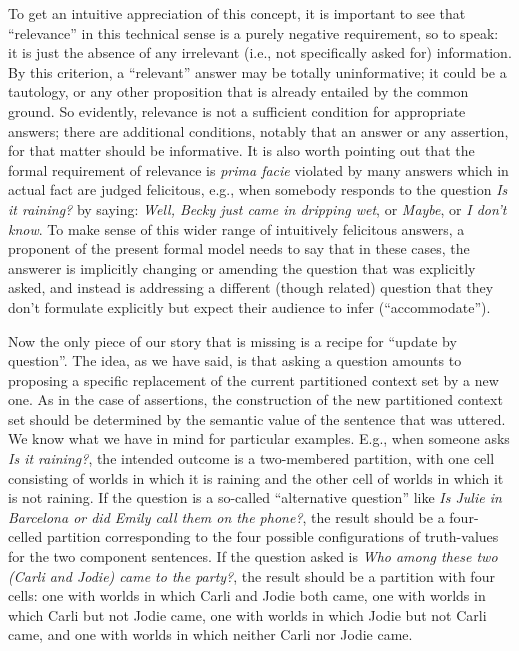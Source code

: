 To get an intuitive appreciation of this concept, it is important to see that
``relevance'' in this technical sense is a purely negative requirement, so to
speak: it is just the absence of any irrelevant (i.e., not specifically asked
for) information. By this criterion, a ``relevant'' answer may be totally
uninformative; it could be a tautology, or any other proposition that is already
entailed by the common ground. So evidently, relevance is not a sufficient
condition for appropriate answers; there are additional conditions, notably that
an answer \dash or any assertion, for that matter \dash should be informative.
It is also worth pointing out that the formal requirement of relevance is
\emph{prima facie} violated by many answers which in actual fact are judged
felicitous, e.g., when somebody responds to the question \emph{Is it raining?}
by saying: \emph{Well, Becky just came in dripping wet}, or \emph{Maybe}, or
\emph{I don't know}. To make sense of this wider range of intuitively felicitous
answers, a proponent of the present formal model needs to say that in these
cases, the answerer is implicitly changing or amending the question that was
explicitly asked, and instead is addressing a different (though related)
question that they don't formulate explicitly but expect their audience to infer
(``accommodate'').

Now the only piece of our story that is missing is a recipe for ``update by
question''. The idea, as we have said, is that asking a question amounts to
proposing a specific replacement of the current partitioned context set by a new
one. As in the case of assertions, the construction of the new partitioned
context set should be determined by the semantic value of the sentence that was
uttered. We know what we have in mind for particular examples. E.g., when
someone asks \emph{Is it raining?}, the intended outcome is a two-membered
partition, with one cell consisting of worlds in which it is raining and the
other cell of worlds in which it is not raining. If the question is a so-called
``alternative question'' like \emph{Is Julie in Barcelona or did Emily call them
  on the phone?}, the result should be a four-celled partition corresponding to
the four possible configurations of truth-values for the two component
sentences. If the question asked is \emph{Who among these two (Carli and Jodie)
  came to the party?}, the result should be a partition with four cells: one
with worlds in which Carli and Jodie both came, one with worlds in which Carli
but not Jodie came, one with worlds in which Jodie but not Carli came, and one
with worlds in which neither Carli nor Jodie came.

